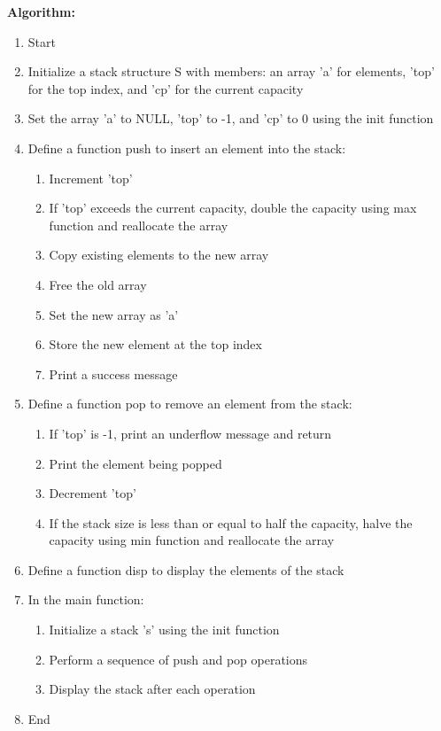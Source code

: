 \documentclass{article}
\begin{document}
\textbf{Algorithm:}
\begin{enumerate}
  \item Start
  \item Initialize a stack structure S with members: an array 'a' for elements, 'top' for the top index, and 'cp' for the current capacity
  \item Set the array 'a' to NULL, 'top' to -1, and 'cp' to 0 using the init function
  \item Define a function push to insert an element into the stack:
    \begin{enumerate}
      \item Increment 'top'
      \item If 'top' exceeds the current capacity, double the capacity using max function and reallocate the array
      \item Copy existing elements to the new array
      \item Free the old array
      \item Set the new array as 'a'
      \item Store the new element at the top index
      \item Print a success message
    \end{enumerate}
  \item Define a function pop to remove an element from the stack:
    \begin{enumerate}
      \item If 'top' is -1, print an underflow message and return
      \item Print the element being popped
      \item Decrement 'top'
      \item If the stack size is less than or equal to half the capacity, halve the capacity using min function and reallocate the array
    \end{enumerate}
  \item Define a function disp to display the elements of the stack
  \item In the main function:
    \begin{enumerate}
      \item Initialize a stack 's' using the init function
      \item Perform a sequence of push and pop operations
      \item Display the stack after each operation
    \end{enumerate}
  \item End
\end{enumerate}
\end{document}
